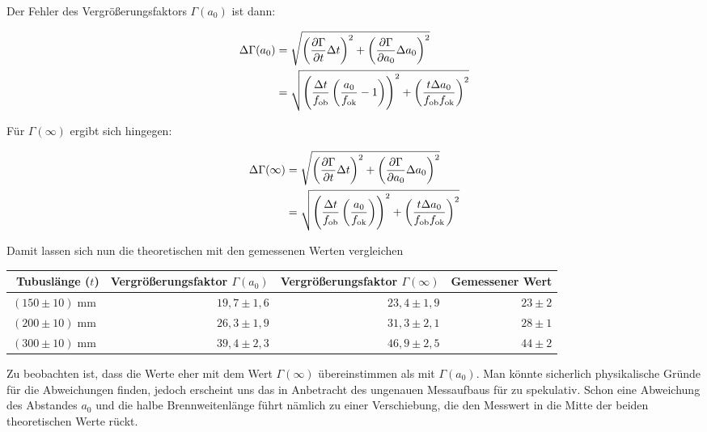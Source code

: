 \documentclass[a4paper,german,12pt,smallheadings]{scrartcl}
\begin{document}
Der Fehler des Vergrößerungsfaktors $\Gamma(a_0)$ ist dann:

\begin{align*}
  \Delta \Gamma(a_0) &= \sqrt{
    \del{\frac{\partial \Gamma}{\partial t} \Delta t}^2 +
    \del{\frac{\partial \Gamma}{\partial a_0} \Delta a_0}^2
  } \\
  &= \sqrt{
    \del{
      \frac{\Delta t}{f_\text{ob}} \del{
        \frac{a_0}{f_\text{ok}} - 1
      }
    }^2 +
    \del{
      \frac{t \Delta a_0}{f_\text{ob} f_\text{ok}}
    }^2
  }
\end{align*}

Für $\Gamma(\infty)$ ergibt sich hingegen:

\begin{align*}
  \Delta \Gamma(\infty) &= \sqrt{
    \del{\frac{\partial \Gamma}{\partial t} \Delta t}^2 +
    \del{\frac{\partial \Gamma}{\partial a_0} \Delta a_0}^2
  } \\
  &= \sqrt{
    \del{
      \frac{\Delta t}{f_\text{ob}} \del{
        \frac{a_0}{f_\text{ok}}
      }
    }^2 +
    \del{
      \frac{t \Delta a_0}{f_\text{ob} f_\text{ok}}
    }^2
  }
\end{align*}

Damit lassen sich nun die theoretischen mit den gemessenen Werten vergleichen

\hspace{5 mm}

\begin{tabular}{ r | r | r | r}
  Tubuslänge ($t$) & Vergrößerungsfaktor $\Gamma(a_0)$ & Vergrößerungsfaktor $\Gamma(\infty)$ & Gemessener Wert \\
  \hline
  $(150\pm10) \operatorname{mm}$ & $19{,}7\pm1{,}6$ & $23{,}4\pm1{,}9$ & $23\pm2$ \\
  $(200\pm10) \operatorname{mm}$ & $26{,}3\pm1{,}9$ & $31{,}3\pm2{,}1$ & $28\pm1$ \\
  $(300\pm10) \operatorname{mm}$ & $39{,}4\pm2{,}3$ & $46{,}9\pm2{,}5$ & $44\pm2$ \\
\end{tabular}

\hspace{5mm}

Zu beobachten ist, dass die Werte eher mit dem Wert $\Gamma(\infty)$
übereinstimmen als mit $\Gamma(a_0)$. Man könnte sicherlich physikalische
Gründe für die Abweichungen finden, jedoch erscheint uns das in Anbetracht
des ungenauen Messaufbaus für zu spekulativ. Schon eine Abweichung des
Abstandes $a_0$ und die halbe Brennweitenlänge führt nämlich zu einer
Verschiebung, die den Messwert in die Mitte der beiden theoretischen Werte
rückt.
\end{document}
